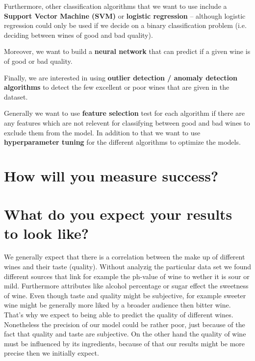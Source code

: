 \documentclass[11pt,titlepage,oneside,openany]{article}
\begin{document}
Furthermore, other classification algorithms that we want to use include a \textbf{Support Vector Machine (SVM)}
or \textbf{logistic regression} -- although logistic regression could only be used if we decide on
a binary classification problem (i.e. deciding between wines of good and bad quality).

Moreover, we want to build a \textbf{neural network} that can predict if a given wine is of good or bad quality.

Finally, we are interested in using \textbf{outlier detection / anomaly detection algorithms} to detect the few 
excellent or poor wines that are given in the dataset.

Generally we want to use \textbf{feature selection} test for each algorithm if there are any features which are not relevent 
for classifying between good and bad wines to exclude them from the model. In addition to that we want to use 
\textbf{hyperparameter tuning} for the different algorithms to optimize the models.

\section{How will you measure success?}

\section{What do you expect your results to look like?}
We generally expect that there is a correlation between the make up of different wines and their taste (quality). Without analyzig the particular data set we found different sources that link for example the ph-value of wine to wether it is sour or mild. Furthermore attributes like alcohol percentage or sugar effect the sweetness of wine. Even though taste and quality might be subjective, for example sweeter wine might be generally more liked by a broader audience then bitter wine. That's why we expect to being able to predict the quality of different wines. Nonetheless the precision of our model could be rather poor, just because of the fact that quality and taste are subjective. On the other hand the quality of wine must be influenced by its ingredients, because of that our results might be more precise then we initially expect.

%
%




\end{document}
